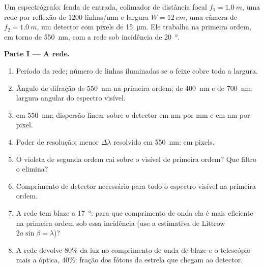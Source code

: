 \begin{problem}
\label{pb:b2:gratings:1}

Um espectrógrafo: fenda de entrada, colimador de distância focal $f_1 =
\qty{1.0}{m}$, uma rede por reflexão de $1200$ linhas/mm e largura $W =
\qty{12}{cm}$, uma câmera de $f_2 = \qty{1.0}{m}$, um detector com pixels de \qty{15}{\micro m}.
Ele trabalha na primeira ordem, em torno de \qty{550}{nm}, com a
rede sob incidência de \qty{20}{\degree}.

\medskip
\noindent\textbf{Parte I --- A rede.}
\begin{enumerate}
  \item Período da rede; número de linhas iluminadas se o feixe cobre
        toda a largura.
  \item Ângulo de difração de \qty{550}{nm} na primeira ordem; de
        \qty{400}{nm} e de \qty{700}{nm}; largura angular do espectro
        visível.
  \item {} em \qty{550}{nm}; dispersão linear sobre o
        detector em nm por mm e em nm por pixel.
  \item Poder de resolução; menor $\Delta\lambda$ resolvido em \qty{550}{nm}; em
        pixels.
  \item O violeta de segunda ordem cai sobre o visível de primeira
        ordem? Que filtro o elimina?
  \item Comprimento de detector necessário para todo o espectro visível na
        primeira ordem.
  \item A rede tem blaze a \qty{17}{\degree}: para que comprimento de onda ela é
        mais eficiente na primeira ordem sob essa incidência (use
        a estimativa de Littrow $2a\sin\beta = \lambda$)?
  \item A rede devolve $80\%$ da luz no comprimento de onda de blaze
        e o telescópio mais a óptica, $40\%$: fração dos fótons da estrela
        que chegam ao detector.
\end{enumerate}


\end{problem}

